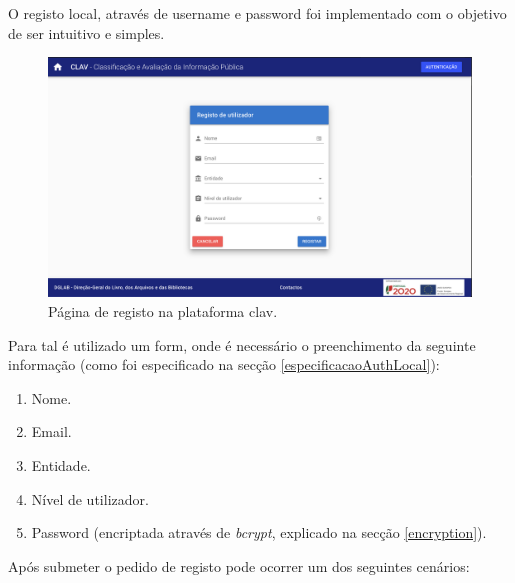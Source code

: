 O registo local, através de username e password foi implementado com o objetivo de ser intuitivo e simples. 

\begin{figure}[h!]
    \centering
    \includegraphics[width=\textwidth]{img/clav/authlocal/registo.png}
    \caption{Página de registo na plataforma \gls{clav}.}
    \label{fig:paginaRegistoLocal}
\end{figure}

Para tal é utilizado um form, onde é necessário o preenchimento da seguinte informação (como foi especificado na secção \ref{especificacaoAuthLocal}):
\begin{enumerate}
    \item Nome.
    \item Email.
    \item Entidade.
    \item Nível de utilizador.
    \item Password (encriptada através de \emph{bcrypt}, explicado na secção \ref{encryption}).
\end{enumerate}

Após submeter o pedido de registo pode ocorrer um dos seguintes cenários:

